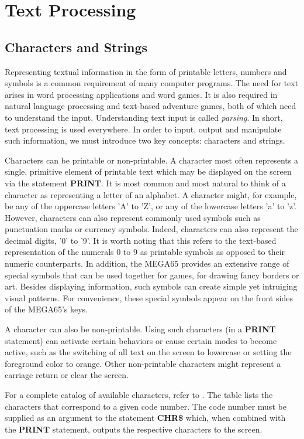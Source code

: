 \chapter{Text Processing}

\section{Characters and Strings}
Representing textual information in the form of printable letters, numbers and symbols is a common requirement of many computer programs. The need for text arises in word processing applications and word games. It is also required in natural language processing and text-based adventure games, both of which need to understand the input. Understanding text input is called {\it parsing}. In short, text processing is used everywhere. In order to input, output and manipulate such information, we must introduce two key concepts: characters and strings.

Characters can be printable or non-printable. A character most often represents a single, primitive element of printable text which may be displayed on the screen via the statement {\bf PRINT}. It is most common and most natural to think of a character as representing a letter of an alphabet. A character might, for example, be any of the uppercase letters 'A' to 'Z', or any of the lowercase letters 'a' to 'z'. However, characters can also represent commonly used symbols such as punctuation marks or currency symbols. Indeed, characters can also represent the decimal digits, '0' to '9'. It is worth noting that this refers to the text-based representation of the numerals 0 to 9 as printable symbols as opposed to their numeric counterparts. In addition, the MEGA65 provides an extensive range of special symbols that can be used together for games, for drawing fancy borders or art. Besides displaying information, such symbols can create simple yet intruiging visual patterns. For convenience, these special symbols appear on the front sides of the MEGA65's keys.

A character can also be non-printable. Using such characters
(in a {\bf PRINT} statement) can activate certain behaviors or cause
certain modes to become active, such as the switching of all text on the
screen to lowercase or setting the foreground color to orange. Other
non-printable characters might represent a carriage return or clear the screen.

For a complete catalog of available characters, refer to . The table lists the characters that correspond to a given code number. The code number must be supplied as an argument to the statement {\bf CHR\$} which, when combined with the {\bf PRINT} statement, outputs the respective characters to the screen.

